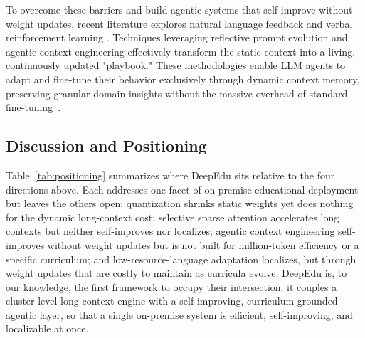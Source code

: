 \documentclass[10pt,conference]{IEEEtran}
\begin{document}
To overcome these barriers and build agentic systems that self-improve without weight updates, recent literature explores natural language feedback and verbal reinforcement learning \cite{krause2019dynamic, shinn2023reflexion, nature2025optimizing}. Techniques leveraging reflective prompt evolution \cite{gepa2025} and agentic context engineering \cite{agenticcontext2026} effectively transform the static context into a living, continuously updated "playbook." These methodologies enable LLM agents to adapt and fine-tune their behavior exclusively through dynamic context memory, preserving granular domain insights without the massive overhead of standard fine-tuning~\cite{memento_no_date}.

\subsection{Discussion and Positioning}
\label{subsec:rw-positioning}

Table~\ref{tab:positioning} summarizes where DeepEdu sits relative to the
four directions above. Each addresses one facet of on-premise educational
deployment but leaves the others open: quantization shrinks static weights
yet does nothing for the dynamic long-context cost; selective sparse
attention accelerates long contexts but neither self-improves nor
localizes; agentic context engineering self-improves without weight
updates but is not built for million-token efficiency or a specific
curriculum; and low-resource-language adaptation localizes, but through
weight updates that are costly to maintain as curricula evolve. DeepEdu is,
to our knowledge, the first framework to occupy their intersection: it
couples a cluster-level long-context engine with a self-improving,
curriculum-grounded agentic layer, so that a single on-premise system is
efficient, self-improving, and localizable at once.
\end{document}
